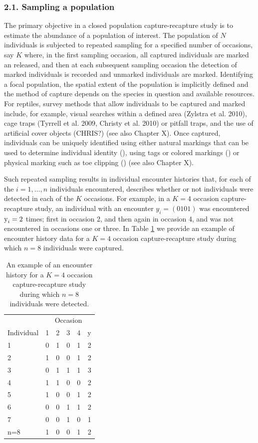 \documentclass{book}
\begin{document}
\subsubsection*{2.1. Sampling a population}

The primary objective in a closed population capture-recapture study is
to estimate the abundance of a population of interest. The population
of $N$ individuals is subjected to repeated sampling for a specified
number of occasions, say $K$ where, in the first sampling occasion,
all captured individuals are marked an released, and then at each
subsequent sampling occasion the detection of marked individuals is
recorded and unmarked individuals are marked. Identifying a focal
population, the spatial extent of the population is implicitly defined
and the method of capture depends on the species in question and
available resources. For reptiles, survey methods that allow
individuals to be captured and marked include, for example, visual
searches within a defined area (Zylstra et al. 2010),
cage traps (Tyrrell et al. 2009, Christy et al. 2010) 
or pitfall traps, and the use of
artificial cover objects (CHRIS?) (see also Chapter X). Once captured,
individuals can be uniquely identified using either natural markings
that can be used to determine individual identity (), using tags or
colored markings () or physical marking such as toe clipping () (see
also Chapter X).

Such repeated sampling results in individual encounter histories that,
for each of the $i=1,\ldots,n$ individuals encountered, describes
whether or not individuals were detected in each of the $K$
occasions. For example, in a $K = 4$ occasion capture-recapture study,
an individual with an encounter $y_i = (0 1 0 1)$ was encountered
$\hbox{y}_i = 2$ times; first in occasion 2, and then again in
occasion 4, and was not encountered in occasions one or three. In
Table \ref{enchist} we provide an example of encounter history data
for a $K=4$ occasion capture-recapture study during which $n=8$
individuals were captured.

\begin{table}[h]
  \centering
  \caption{An example of an encounter history for a $K = 4$ occasion capture-recapture study during which $n=8$ individuals were detected.}
  \label{enchist}
 \begin{tabular}{lccccr}
 \hline
    &\multicolumn{5}{c}{Occasion} \\
  Individual & 1 & 2 & 3 & 4 & y\\
 \hline
  1   & 0 & 1 & 0 & 1 & 2 \\
  2   & 1 & 0 & 0 & 1 & 2 \\
  3   & 0 & 1 & 1 & 1 & 3 \\
  4   & 1 & 1 & 0 & 0 & 2 \\
  5   & 1 & 0 & 0 & 1 & 2 \\
  6   & 0 & 0 & 1 & 1 & 2 \\
  7   & 0 & 0 & 1 & 0 & 1 \\
  n=8 & 1 & 0 & 0 & 1 & 2 \\
 \hline
 \end{tabular}
\end{table}
\end{document}
